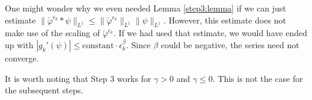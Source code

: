 \begin{remark}
One might wonder why we even needed Lemma \ref{step3:lemma} if we can just estimate $\lVert \check \varphi^{\epsilon_k} * \psi \rVert_{L^1} \leq \lVert \check \varphi^{\epsilon_k} \rVert_{L^1} \lVert \psi \rVert_{L^1}$. However, this estimate does not make use of the scaling of $\check \varphi^{\epsilon_k}$. If we had used that estimate, we would have ended up with $|g_k'(\psi)| \leq \mathrm{constant} \cdot \epsilon_k^{\beta}$. Since $\beta$ could be negative, the series need not converge.
\end{remark}

It is worth noting that Step 3 works for $\gamma > 0$ and $\gamma \leq 0$. This is not the case for the subsequent steps.  
